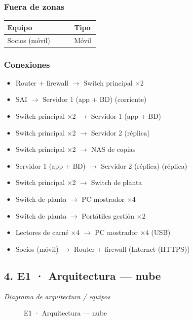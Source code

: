 \subsubsection*{Fuera de zonas}

{\small
\begin{longtable}{@{}>{\raggedright\arraybackslash}p{0.686\linewidth}>{\raggedright\arraybackslash}p{0.263\linewidth}@{}}
\toprule
\textbf{Equipo} & \textbf{Tipo} \\
\midrule
\endhead
Socios (móvil) & Móvil \\
\bottomrule
\end{longtable}}

\subsubsection*{Conexiones}

\begin{itemize}
\item Router + firewall $\rightarrow$ Switch principal ×2
\item SAI $\rightarrow$ Servidor 1 (app + BD) (corriente)
\item Switch principal ×2 $\rightarrow$ Servidor 1 (app + BD)
\item Switch principal ×2 $\rightarrow$ Servidor 2 (réplica)
\item Switch principal ×2 $\rightarrow$ NAS de copias
\item Servidor 1 (app + BD) $\rightarrow$ Servidor 2 (réplica) (réplica)
\item Switch principal ×2 $\rightarrow$ Switch de planta
\item Switch de planta $\rightarrow$ PC mostrador ×4
\item Switch de planta $\rightarrow$ Portátiles gestión ×2
\item Lectores de carné ×4 $\rightarrow$ PC mostrador ×4 (USB)
\item Socios (móvil) $\rightarrow$ Router + firewall (Internet (HTTPS))
\end{itemize}

\subsection*{4. E1 · Arquitectura — nube}

\emph{Diagrama de arquitectura / equipos}

\begin{figure}[H]
\centering
{}
\caption{E1 · Arquitectura — nube}
\end{figure}

